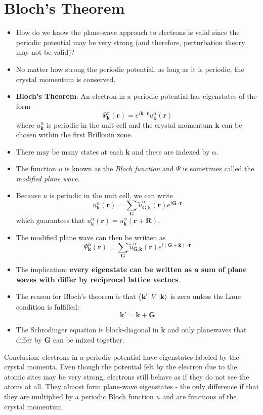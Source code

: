 \documentclass[10pt]{article}
\begin{document}
\section{Bloch's Theorem}
\begin{itemize}
  \item How do we know the plane-wave approach to electrons is valid since the periodic potential may be very strong (and
  therefore, perturbation theory may not be valid)?
  \item No matter how strong the periodic potential, as long as it is periodic, the crystal momentum is conserved.
  \item  \textbf{Bloch's Theorem}: An electron in a periodic potential has eigenstates of the form
  $$\Psi_{\textbf{k}}^{\alpha}(\textbf{r}) = e^{i\textbf{k}\cdot\textbf{r}}u_{\textbf{k}}^{\alpha}(\textbf{r})$$
  where $u_{\textbf{k}}^{\alpha}$ is periodic in the unit cell and the crystal momentum $\textbf{k}$ can be chosen
  within the first Brillouin zone.
  \item There may be many states at each $\textbf{k}$ and these are indexed by $\alpha$.
  \item The function $u$ is known as the \emph{Bloch function} and $\Psi$ is sometimes called the \emph{modified plane wave}.
  \item Because $u$ is periodic in the unit cell, we can write
  $$
  u_{\textbf{k}}^{\alpha}(\textbf{r}) = \sum_{\textbf{G}} \tilde{u}_{\textbf{G},\textbf{k}}^{\alpha}(\textbf{r})e^{i\textbf{G}\cdot\textbf{r}}
  $$
  which guarantees that $u_{\textbf{k}}^{\alpha}(\textbf{r}) = u_{\textbf{k}}^{\alpha}(\textbf{r} + \textbf{R})$.
  \item The modified plane wave can then be written as
  $$\Psi_{\textbf{k}}^{\alpha}(\textbf{r}) = \sum_{\textbf{G}} \tilde{u}_{\textbf{G},\textbf{k}}^{\alpha}(\textbf{r})e^{i(\textbf{G}+\textbf{k})\cdot\textbf{r}}$$
  \item The implication: \textbf{every eigenstate can be written as a sum of plane waves with differ by reciprocal lattice vectors}.
  \item The reason for Bloch's theorem is that $\bra{\textbf{k}'}V\ket{\textbf{k}}$ is zero unless the Laue condition is fulfilled:
  $$\textbf{k}' = \textbf{k} + \textbf{G}$$
  \item The Schrodinger equation is block-diagonal in $\textbf{k}$ and only planewaves that differ by $\textbf{G}$ can be mixed together.
\end{itemize}

Conclusion: electrons in a periodic potential have eigenstates labeled by the crystal momenta. Even though the potential felt by the
electron due to the atomic sites may be very strong, electrons still behave as if they do not see the atoms at all. They almost form
plane-wave eigenstates - the only difference if that they are multiplied by a periodic Bloch function $u$ and are functions of the
crystal momentum.
\end{document}
